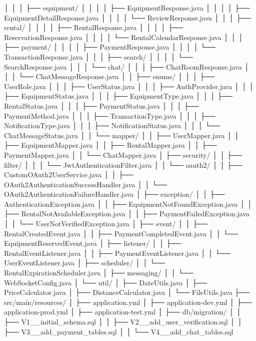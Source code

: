 │   │   │       ├── equipment/
│   │   │       │   ├── EquipmentResponse.java
│   │   │       │   ├── EquipmentDetailResponse.java
│   │   │       │   └── ReviewResponse.java
│   │   │       ├── rental/
│   │   │       │   ├── RentalResponse.java
│   │   │       │   ├── ReservationResponse.java
│   │   │       │   └── RentalCalendarResponse.java
│   │   │       ├── payment/
│   │   │       │   ├── PaymentResponse.java
│   │   │       │   └── TransactionResponse.java
│   │   │       ├── search/
│   │   │       │   └── SearchResponse.java
│   │   │       └── chat/
│   │   │           ├── ChatRoomResponse.java
│   │   │           └── ChatMessageResponse.java
│   │   ├── enums/
│   │   │   ├── UserRole.java
│   │   │   ├── UserStatus.java
│   │   │   ├── AuthProvider.java
│   │   │   ├── EquipmentStatus.java
│   │   │   ├── EquipmentType.java
│   │   │   ├── RentalStatus.java
│   │   │   ├── PaymentStatus.java
│   │   │   ├── PaymentMethod.java
│   │   │   ├── TransactionType.java
│   │   │   ├── NotificationType.java
│   │   │   ├── NotificationStatus.java
│   │   │   └── ChatMessageStatus.java
│   │   └── mapper/
│   │       ├── UserMapper.java
│   │       ├── EquipmentMapper.java
│   │       ├── RentalMapper.java
│   │       ├── PaymentMapper.java
│   │       └── ChatMapper.java
│   ├── security/
│   │   ├── filter/
│   │   │   └── JwtAuthenticationFilter.java
│   │   └── oauth2/
│   │       ├── CustomOAuth2UserService.java
│   │       ├── OAuth2AuthenticationSuccessHandler.java
│   │       └── OAuth2AuthenticationFailureHandler.java
│   ├── exception/
│   │   ├── AuthenticationException.java
│   │   ├── EquipmentNotFoundException.java
│   │   ├── RentalNotAvailableException.java
│   │   ├── PaymentFailedException.java
│   │   └── UserNotVerifiedException.java
│   ├── event/
│   │   ├── RentalCreatedEvent.java
│   │   ├── PaymentCompletedEvent.java
│   │   └── EquipmentReservedEvent.java
│   ├── listener/
│   │   ├── RentalEventListener.java
│   │   ├── PaymentEventListener.java
│   │   └── UserEventListener.java
│   ├── scheduler/
│   │   └── RentalExpirationScheduler.java
│   ├── messaging/
│   │   └── WebSocketConfig.java
│   └── util/
│       ├── DateUtils.java
│       ├── PriceCalculator.java
│       ├── DistanceCalculator.java
│       └── FileUtils.java
├── src/main/resources/
│   ├── application.yml
│   ├── application-dev.yml
│   ├── application-prod.yml
│   ├── application-test.yml
│   ├── db/migration/
│   │   ├── V1__initial_schema.sql
│   │   ├── V2__add_user_verification.sql
│   │   ├── V3__add_payment_tables.sql
│   │   └── V4__add_chat_tables.sql
